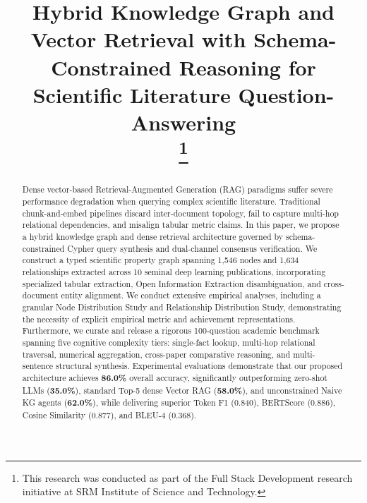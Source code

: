 \documentclass[conference]{IEEEtran}
\begin{document}
\title{Hybrid Knowledge Graph and Vector Retrieval with Schema-Constrained Reasoning for Scientific Literature Question-Answering\\
\thanks{This research was conducted as part of the Full Stack Development research initiative at SRM Institute of Science and Technology.}
}

\author{
\and
{}
}

\maketitle

\begin{abstract}
Dense vector-based Retrieval-Augmented Generation (RAG) paradigms suffer severe performance degradation when querying complex scientific literature. Traditional chunk-and-embed pipelines discard inter-document topology, fail to capture multi-hop relational dependencies, and misalign tabular metric claims. In this paper, we propose a hybrid knowledge graph and dense retrieval architecture governed by schema-constrained Cypher query synthesis and dual-channel consensus verification. We construct a typed scientific property graph spanning 1,546 nodes and 1,634 relationships extracted across 10 seminal deep learning publications, incorporating specialized tabular extraction, Open Information Extraction disambiguation, and cross-document entity alignment. We conduct extensive empirical analyses, including a granular Node Distribution Study and Relationship Distribution Study, demonstrating the necessity of explicit empirical metric and achievement representations. Furthermore, we curate and release a rigorous 100-question academic benchmark spanning five cognitive complexity tiers: single-fact lookup, multi-hop relational traversal, numerical aggregation, cross-paper comparative reasoning, and multi-sentence structural synthesis. Experimental evaluations demonstrate that our proposed architecture achieves \textbf{86.0\%} overall accuracy, significantly outperforming zero-shot LLMs (\textbf{35.0\%}), standard Top-5 dense Vector RAG (\textbf{58.0\%}), and unconstrained Naive KG agents (\textbf{62.0\%}), while delivering superior Token F1 (0.840), BERTScore (0.886), Cosine Similarity (0.877), and BLEU-4 (0.368).
\end{abstract}
\end{document}
